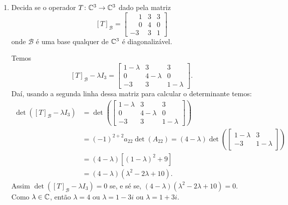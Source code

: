\begin{exemplo}
\begin{enumerate}[label={\arabic*})]
        \item Decida se o operador $T \colon \mathbb{C}^3 \to \mathbb{C}^3$ dado pela matriz
            \[
                [T]_\mathcal{B} = \begin{bmatrix}\phantom{-}1 & 3 & 3\\\phantom{-}0 & 4 & 0\\-3 & 3 & 1\end{bmatrix}
            \]
            onde $\mathcal{B}$ é uma base qualquer de $\mathbb{C}^3$ é diagonalizável.
            \begin{solucao}
                Temos
                \[
                    [T]_\mathcal{B} - \lambda I_3 = \begin{bmatrix}1 - \lambda & 3 & 3\\0 & 4 - \lambda & 0\\-3 & 3 & 1 - \lambda\end{bmatrix}.
                \]
                Daí, usando a segunda linha dessa matriz para calcular o determinante temos:
                \begin{align*}
                    \det([T]_\mathcal{B} - \lambda I_3) &= \det\left(\begin{bmatrix}1 - \lambda & 3 & 3\\0 & 4 - \lambda & 0\\-3 & 3 & 1 - \lambda\end{bmatrix}\right) \\ &= (-1)^{2 + 2}a_22\det(A_{22}) = (4 - \lambda)\det\left(\begin{bmatrix}1 - \lambda & 3\\-3 & 1 - \lambda\end{bmatrix}\right) \\ &= (4 - \lambda)[(1 - \lambda)^2 + 9] \\ &= (4 - \lambda)(\lambda^2 - 2\lambda + 10).
                \end{align*}
                Assim $\det([T]_\mathcal{B} - \lambda I_3) = 0$ se, e sé se, $(4 - \lambda)(\lambda^2 - 2\lambda + 10) = 0$. Como $\lambda \in \mathbb{C}$, então $\lambda = 4$ ou $\lambda = 1 - 3i$ ou $\lambda = 1 + 3i$.


\end{solucao}
\end{enumerate}
\end{exemplo}
